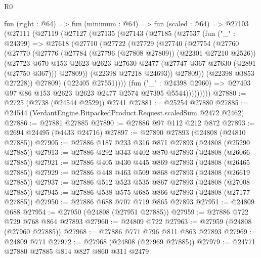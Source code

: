 \begin{lexlean}{R0}
\begin{coremodule}
    fun (right : @64) =>
    fun (minimum : @64) =>
    fun (scaled : @64) =>
    @27103
      (@27111
        (@27119
          (@27127
            (@27135
              (@27143
                (@27185
                  (@27537
                    (fun ("_" : @24399) =>
                    @27618
                      (@27710
                        (@27722
                          (@27729
                            (@27740
                              (@27754
                                (@27760
                                  (@27770
                                    (@27776
                                      (@27784 (@27796 (@27808 @27809)) (@22301 @27210 @2526))
                                      (@27723
                                        @670
                                        @153
                                        @2623
                                        @2623
                                        @27630
                                        @2477
                                        (@27747 @367 @27630 (@2891 (@27750 @367)))
                                        @27809))
                                    (@22398 @27218 @24693))
                                  @27809))
                              (@22398 @3853 @27228))
                            @27809)
                          (@22405 @27551))))
                    (fun ("_" : @24398 @2960) =>
                    @27403 @97 @86 @153 @2623 @2623 @2477 @2574 @27395 @5544)))))))))
@27880 := @2725 (@2738 (@24544 @2529)) @2741
@27881 := @25254 @27880
@27885 := @24544 (VerdantEngine.BitpackedProduct.Request.scaledSum @2472 @2462)
@27886 := @27881 @27885
@27890 := @27886 @97 @112 @212 @872
@27893 := @2694 @24495 (@4433 @24716)
@27897 := @27890 @27893 (@24808 (@24810 @27885))
@27905 := @27886 @187 @233 @316 @871 @27893 (@24808 (@25290 @27885))
@27913 := @27886 @292 @343 @402 @870 @27893 (@24808 (@26066 @27885))
@27921 := @27886 @405 @430 @445 @869 @27893 (@24808 (@26465 @27885))
@27929 := @27886 @448 @463 @509 @868 @27893 (@24808 (@26619 @27885))
@27937 := @27886 @512 @523 @535 @867 @27893 (@24808 (@27008 @27885))
@27945 := @27886 @538 @575 @685 @866 @27893 (@24808 (@27177 @27885))
@27950 := @27886 @688 @707 @719 @865 @27893
@27951 := @24809 @688
@27954 := @27950 (@24808 (@27951 @27885))
@27959 := @27886 @722 @729 @768 @864 @27893
@27960 := @24809 @722
@27963 := @27959 (@24808 (@27960 @27885))
@27968 := @27886 @771 @796 @811 @863 @27893
@27969 := @24809 @771
@27972 := @27968 (@24808 (@27969 @27885))
@27979 := @24771 @27880 @27885 @814 @827 @860 @311 @2479

\end{coremodule}
\end{lexlean}
